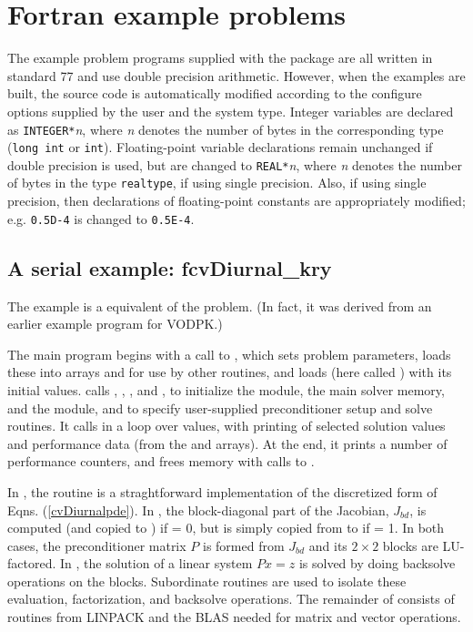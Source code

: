 \section{Fortran example problems}\label{s:ex_fortran}

The {\F} example problem programs supplied with the {\cvode}
package are all written in standard {\F}77 and use double precision
arithmetic. However, when the {\F} examples are built, the source code is
automatically modified according to the configure options supplied by the
user and the system type. Integer variables are declared as {\tt INTEGER*}{\em n},
where {\em n} denotes the number of bytes in the corresponding {\C} type
({\tt long int} or {\tt int}). Floating-point variable declarations remain
unchanged if double precision is used, but are changed to {\tt REAL*}{\em n},
where {\em n} denotes the number of bytes in the {\sundials} type {\tt realtype},
if using single precision. Also, if using single precision, then declarations of
floating-point constants are appropriately modified; e.g. {\tt 0.5D-4} is
changed to {\tt 0.5E-4}.


\subsection{A serial example: fcvDiurnal\_kry}\label{ss:fcvDiurnal} 
The  example is a {\F} equivalent of the  problem.
(In fact, it was derived from an earlier {\F} example program for VODPK.)

The main program begins with a call to , which sets problem
parameters, loads these into arrays  and  for use by other
routines, and loads  (here called ) with its initial values.
 calls , , , and ,
to initialize the {\nvecs} module, the main solver memory, and the {\cvspgmr} module,
and to specify user-supplied preconditioner setup and solve routines.
It calls  in a loop over  values, with printing of
selected solution values and performance data (from the   and 
arrays).  At the end, it prints a number of performance counters, and
frees memory with calls to .

In , the  routine is a straghtforward implementation
of the discretized form of Eqns. (\ref{cvDiurnalpde}).  In , the
block-diagonal part of the Jacobian, $J_{bd}$, is computed (and copied to
) if  = 0, but is simply copied from  to  if
 = 1.  In both cases, the preconditioner matrix $P$ is formed from 
$J_{bd}$ and its $2 \times 2$ blocks are LU-factored.  In ,
the solution of a linear system $Px = z$ is solved by doing backsolve
operations on the blocks.  Subordinate routines are used to isolate
these evaluation, factorization, and backsolve operations.
The remainder of  consists of
routines from LINPACK and the BLAS needed for matrix and vector operations.


